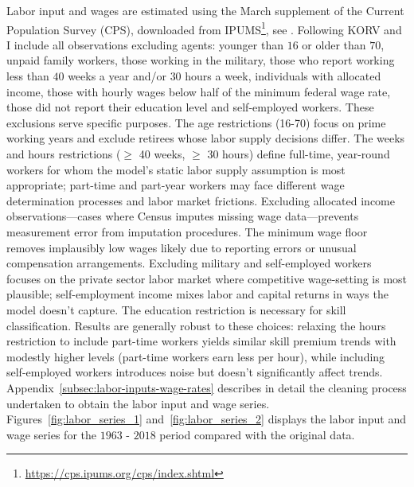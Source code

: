 \documentclass[12pt]{article}
\begin{document}
Labor input and wages are estimated using the March supplement of the Current Population Survey (CPS), downloaded from IPUMS\footnote{\url{https://cps.ipums.org/cps/index.shtml}}, see \citet{flood2015integrated}. Following KORV and \citep{ohanian2021revisiting} I include all observations excluding agents: younger than $16$ or older than $70$, unpaid family workers, those working in the military, those who report working less than $40$ weeks a year and/or $30$ hours a week, individuals with allocated income, those with hourly wages below half of the minimum federal wage rate, those did not report their education level and self-employed workers. These exclusions serve specific purposes. The age restrictions (16-70) focus on prime working years and exclude retirees whose labor supply decisions differ. The weeks and hours restrictions ($\geq$ 40 weeks, $\geq$ 30 hours) define full-time, year-round workers for whom the model's static labor supply assumption is most appropriate; part-time and part-year workers may face different wage determination processes and labor market frictions. Excluding allocated income observations---cases where Census imputes missing wage data---prevents measurement error from imputation procedures. The minimum wage floor removes implausibly low wages likely due to reporting errors or unusual compensation arrangements. Excluding military and self-employed workers focuses on the private sector labor market where competitive wage-setting is most plausible; self-employment income mixes labor and capital returns in ways the model doesn't capture. The education restriction is necessary for skill classification. Results are generally robust to these choices: relaxing the hours restriction to include part-time workers yields similar skill premium trends with modestly higher levels (part-time workers earn less per hour), while including self-employed workers introduces noise but doesn't significantly affect trends. Appendix~\ref{subsec:labor-inputs-wage-rates} describes in detail the cleaning process undertaken to obtain the labor input and wage series. Figures~\ref{fig:labor_series_1} and~\ref{fig:labor_series_2} displays the labor input and wage series for the $1963$ - $2018$ period compared with the original data.
\end{document}
